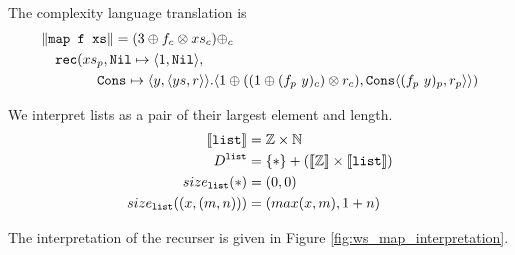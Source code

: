 The complexity language translation is
\begin{equation*}
\begin{split}
    &\|\texttt{map f xs}\| = (3 \oplus f_c \otimes xs_c) \oplus_c \\
    &\quad \texttt{rec}(xs_p, \texttt{Nil}\mapsto \langle 1, \texttt{Nil}\rangle, \\
    &\qquad\quad\quad \texttt{Cons} \mapsto \langle y, \langle ys, r \rangle \rangle. \langle 1 \oplus ((1 \oplus (f_p\ y)_c) \otimes r_c), \texttt{Cons} \langle (f_p\ y)_p, r_p \rangle \rangle)
\end{split}
\end{equation*}


We interpret lists as a pair of their largest element and length.
\begin{align*}
  \llbracket \texttt{list} \rrbracket &= \mathbb{Z} \times \mathbb{N} \\
  D^{\texttt{list}} &= \{*\} + (\llbracket \mathbb{Z} \rrbracket \times \llbracket \texttt{list} \rrbracket) \\
  size_{\texttt{list}}(*) &= (0, 0) \\
  size_{\texttt{list}}((x, (m, n))) &= (max(x, m), 1 + n)
\end{align*}

The interpretation of the recurser is given in Figure \ref{fig:ws_map_interpretation}.

